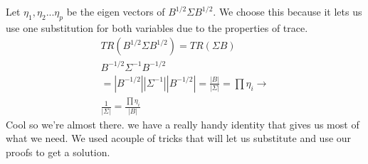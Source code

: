 Let $\eta_1, \eta_2 ... \eta_p$ be the eigen vectors of $B^{1/2}\Sigma B^{1/2}$. We choose this because it lets us use one substitution for both variables due to the properties of trace.
\begin{gather*}
    TR(B^{1/2}\Sigma B^{1/2}) =TR(\Sigma B) \\
    B^{-1/2}\Sigma^{-1} B^{-1/2} \\
    = |B^{-1/2}||\Sigma^{-1}||B^{-1/2}| 
    = \frac{|B|}{|\Sigma|}
    = \prod \eta_i \rightarrow\\ \frac{1}{|\Sigma|} = \frac{\prod \eta_i}{|B|}
\end{gather*}
Cool so we're almost there. we have a really handy identity that gives us most of what we need. We used acouple of tricks that will let us substitute and use our proofs to get a solution.